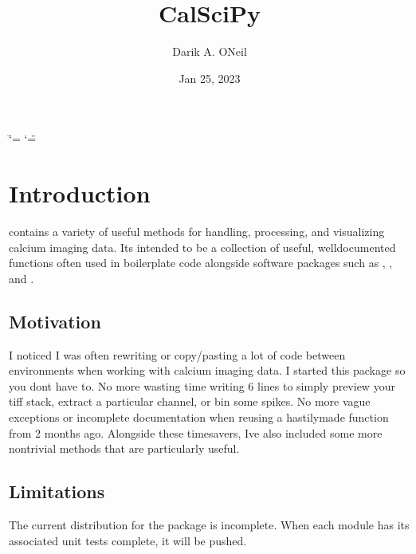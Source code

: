 \documentclass[letterpaper,10pt,english]{sphinxmanual}
\title{CalSciPy}
\date{Jan 25, 2023}
\author{Darik A.\@{} O\textquotesingle{}Neil}
\begin{document}
\ifdefined\shorthandoff
  \ifnum\catcode`\=\string=\active\shorthandoff{=}\fi
  \ifnum\catcode`\"=\active{}\fi
\fi

\pagestyle{empty}
\sphinxmaketitle
\pagestyle{plain}
\sphinxtableofcontents
\pagestyle{normal}
\label{\detokenize{index::doc}}


\sphinxstepscope


\chapter{Introduction}
\label{\detokenize{Introduction:introduction}}\label{\detokenize{Introduction::doc}}
\sphinxAtStartPar
{} contains a variety of useful methods for handling, processing, and visualizing calcium imaging data.
It\textquotesingle{}s intended to be a collection of useful, well\sphinxhyphen{}documented functions often used in boilerplate code alongside software
packages such as , ,
and .


\section{Motivation}
\label{\detokenize{Introduction:motivation}}
\sphinxAtStartPar
I noticed I was often re\sphinxhyphen{}writing or copy/pasting a lot of code between environments when working with calcium imaging
data. I started this package so you don\textquotesingle{}t have to. No more wasting time writing 6 lines to simply preview your tiff
stack, extract a particular channel, or bin some spikes. No more vague exceptions or incomplete documentation when re\sphinxhyphen{}using
a hastily\sphinxhyphen{}made function from 2 months ago. Alongside these time\sphinxhyphen{}savers, I\textquotesingle{}ve also included some more non\sphinxhyphen{}trivial methods
that are particularly useful.


\section{Limitations}
\label{\detokenize{Introduction:limitations}}
\sphinxAtStartPar
The current distribution for the package is incomplete. When each module has its associated unit tests complete, it will
be pushed.

\sphinxstepscope
\end{document}
